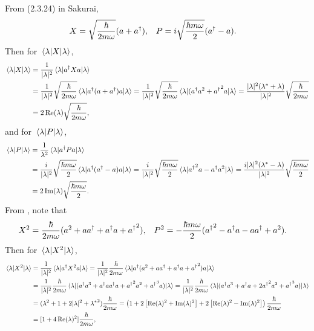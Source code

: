 \begin{solution}
	From (2.3.24) in Sakurai,
	\begin{align} \label{xpa}
		X &= \sqrt{\frac{\hbar}{2 m \omega}} (a + a^\dagger), &
		P &= i \sqrt{\frac{\hbar m \omega}{2}} (a^\dagger - a).
	\end{align}
	Then for $\ev{X}{\lam}$,
	\begin{align}
		\ev{X}{\lam} &= \frac{1}{|\lam|^2} \ev{\ad X a}{\lam} \notag \\
		&= \frac{1}{|\lam|^2} \sqrt{\frac{\hbar}{2 m \omega}} \ev{\ad (a + \ad) a}{\lam}
		= \frac{1}{|\lam|^2} \sqrt{\frac{\hbar}{2 m \omega}} \ev{(\ad a^2 + {\ad}^2 a}{\lam}
		= \frac{|\lam|^2 (\lam^* + \lam)}{|\lam|^2} \sqrt{\frac{\hbar}{2 m \omega}} \notag \\
		&= 2 \Re(\lam) \sqrt{\frac{\hbar}{2 m \omega}}, \label{evX}
	\end{align}
	and for $\ev{P}{\lam}$,
	\begin{align}
		\ev{P}{\lam} &= \frac{1}{\lambda^2} \ev{\ad P a}{\lam} \notag \\
		&= \frac{i}{|\lam|^2} \sqrt{\frac{\hbar m \omega}{2}} \ev{\ad(\ad - a)a}{\lam} = \frac{i}{|\lam|^2} \sqrt{\frac{\hbar m \omega}{2}} \ev{{\ad}^2 a - \ad a^2}{\lam}
		= \frac{i |\lam|^2 (\lam^* - \lam)}{|\lam|^2} \sqrt{\frac{\hbar m \omega}{2}} \notag \\
		&= 2 \Im(\lam) \sqrt{\frac{\hbar m \omega}{2}}. \label{evP}
	\end{align}
	From , note that
	\begin{align*}
		X^2 &= \frac{\hbar}{2 m \omega} (a^2 + a a^\dagger + a^\dagger a + {a^\dagger}^2), &
		P^2 &= -\frac{\hbar m \omega}{2} ({a^\dagger}^2 - a^\dagger a - a a^\dagger + a^2).
	\end{align*}
	Then for $\ev{X^2}{\lam}$,
	\begin{align}
		\ev{X^2}{\lam} &= \frac{1}{|\lam|^2} \ev{\ad X^2 a}{\lam}
		= \frac{1}{|\lam|^2} \frac{\hbar}{2 m \omega} \ev{\ad (a^2 + a \ad + \ad a + {\ad}^2) a}{\lam} \notag \\
		&= \frac{1}{|\lam|^2} \frac{\hbar}{2 m \omega} \ev{(\ad a^3 + \ad a \ad a + {\ad}^2 a^2 + {\ad}^3 a)}{\lam}
		= \frac{1}{|\lam|^2} \frac{\hbar}{2 m \omega} \ev{(\ad a^3 + \ad a + 2 {\ad}^2 a^2 + {\ad}^3 a)}{\lam} \notag \\
		&= (\lam^2 + 1 + 2 |\lam|^2 + {\lam^*}^2) \frac{\hbar}{2 m \omega}
		= \left( 1 + 2 \left[ \Re(\lam)^2 + \Im(\lam)^2 \right] + 2 \left[ \Re(\lam)^2 - \Im(\lam)^2 \right] \right) \frac{\hbar}{2 m \omega} \notag \\
		&= [1 + 4 \Re(\lam)^2 ] \frac{\hbar}{2 m \omega} \label{evXsq},

\end{align}
\end{solution}
